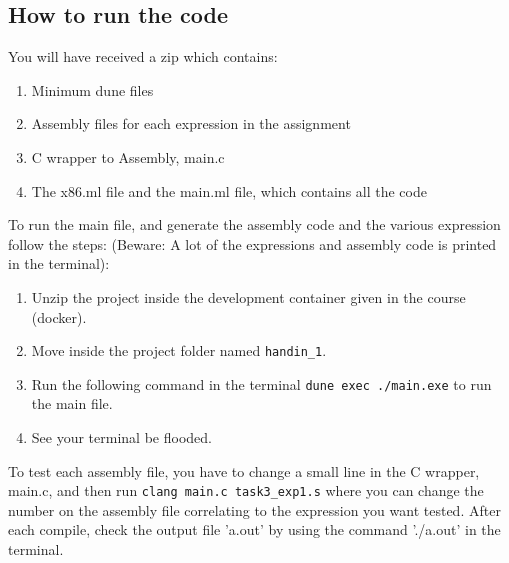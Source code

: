 \documentclass[12pt]{article}
\begin{document}
\subsection*{How to run the code}
You will have received a zip which contains:
\begin{enumerate}
    \item Minimum dune files
    \item Assembly files for each expression in the assignment
    \item C wrapper to Assembly, main.c
    \item The x86.ml file and the main.ml file, which contains all the code
\end{enumerate}
To run the main file, and generate the assembly code and the various expression follow the steps: (Beware: A lot of the expressions and assembly code is printed in the terminal):
\begin{enumerate}
    \item Unzip the project inside the development container given in the course (docker).
    \item Move inside the project folder named \texttt{handin\_1}.
    \item Run the following command in the terminal \texttt{dune exec ./main.exe} to run the main file.
    \item See your terminal be flooded.
\end{enumerate}
To test each assembly file, you have to change a small line in the C wrapper, main.c, and then run \texttt{clang main.c task3\_exp1.s} where you
 can change the number on the assembly file correlating to the expression you want tested. After each compile, check the output file 'a.out' by using the command './a.out' in the terminal.

\printbibliography
\end{document}
